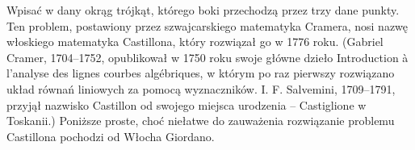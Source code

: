 %





Wpisać w dany okrąg trójkąt, którego boki przechodzą przez trzy dane punkty.
Ten problem, postawiony przez szwajcarskiego matematyka Cramera, nosi nazwę włoskiego matematyka Castillona, który rozwiązał go w 1776 roku.
(Gabriel Cramer, 1704–1752, opublikował w 1750 roku swoje główne dzieło Introduction à l’analyse des lignes courbes algébriques, w którym po raz pierwszy rozwiązano układ równań liniowych za pomocą wyznaczników.
I. F. Salvemini, 1709–1791, przyjął nazwisko Castillon od swojego miejsca urodzenia – Castiglione w Toskanii.)
Poniższe proste, choć niełatwe do zauważenia rozwiązanie problemu Castillona pochodzi od Włocha Giordano.
